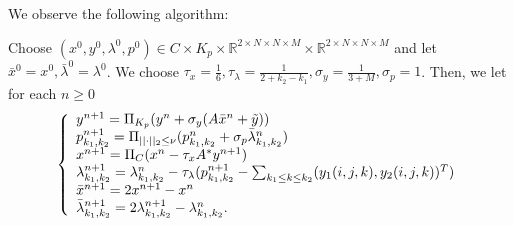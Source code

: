             We observe the following algorithm:
                    \begin{algorithm}
                        Choose $(x^{0}, y^{0}, \lambda^{0}, p^{0}) \in C \times K_{p} \times \mathbb{R}^{2 \times N \times N \times M} \times \mathbb{R}^{2 \times N \times N \times M}$ and let $\bar{x}^{0} = x^{0}, \bar{\lambda}^{0} = \lambda^{0}$. We choose $\tau_{x} = \frac{1}{6}, \tau_{\lambda} = \frac{1}{2 + k_{2} - k_{1}}, \sigma_{y} = \frac{1}{3 + M}, \sigma_{p} = 1$. Then, we let for each $n \ge 0$
                            \begin{equation}
                                \left\{ 
                                    \begin{array}{l l}
                                      y^{n+1} = \Pi_{K_{p}} (y^{n} + \sigma_{y} (A \bar{x}^{n} + \tilde{y})) \\
                                      p_{k_{1}, k_{2}}^{n+1} = \Pi_{||\cdot||_{2} \le \nu} (p_{k_{1}, k_{2}}^{n} + \sigma_{p} \bar{\lambda}_{k_{1}, k_{2}}^{n}) \\
                                      x^{n+1} = \Pi_{C} (x^{n} - \tau_{x} A^{*} y^{n+1}) \\
                                      \lambda_{k_{1}, k_{2}}^{n+1} = \lambda_{k_{1}, k_{2}}^{n} - \tau_{\lambda} (p_{k_{1}, k_{2}}^{n+1} - \sum_{k_{1} \le k \le k_{2}} (y_{1}(i, j, k), y_{2}(i, j, k))^{T}) \\
                                      \bar{x}^{n+1} = 2x^{n+1} - x^{n} \\
                                      \bar{\lambda}_{k_{1}, k_{2}}^{n+1} = 2\lambda_{k_{1}, k_{2}}^{n+1} - \lambda_{k_{1}, k_{2}}^{n}.
                                    \end{array}
                                \right.
                            \end{equation}
                    \end{algorithm}

